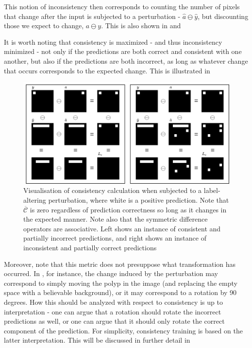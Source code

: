 This notion of inconsistency then corresponds to counting the number of pixels that change after the input is subjected to a perturbation - \(\hat{a}\ominus \hat{y}\), but discounting those we expect to change, \(a\ominus y\). This is also shown in   and 

It is worth noting that consistency is maximized - and thus inconsistency minimized - not only if the predictions are both correct and consistent with one another, but also if the predictions are both incorrect, as long as whatever change that occurs corresponds to the expected change. This is illustrated in 
\begin{figure}[ht]
    \includegraphics[width=\linewidth]{illustrations/loss_visualisation.drawio.png}
    \caption[Segmentation Consistency Visualization 2]{Visualisation of consistency calculation when subjected to a label-altering perturbation, where white is a positive prediction. Note that \(\overline{\mathcal{C}}\) is zero regardless of prediction correctness so long as it changes in the expected manner. Note also that the symmetric difference operators are associative. Left shows an instance of consistent and partially incorrect predictions, and right shows an instance of inconsistent and partially correct predictions}
    \label{loss_fn}
\end{figure}  
    
Moreover, note that this metric does not presuppose what transformation has occurred. In , for instance, the change induced by the perturbation may correspond to simply moving the polyp in the image (and replacing the empty space with a believable background), or it may correspond to a rotation by 90 degrees. How this should be analyzed with respect to consistency is up to interpretation - one can argue that a rotation should rotate the incorrect predictions as well, or one can argue that it should only rotate the correct component of the prediction. For simplicity, consistency training is based on the latter interpretation. This will be discussed in further detail in 

